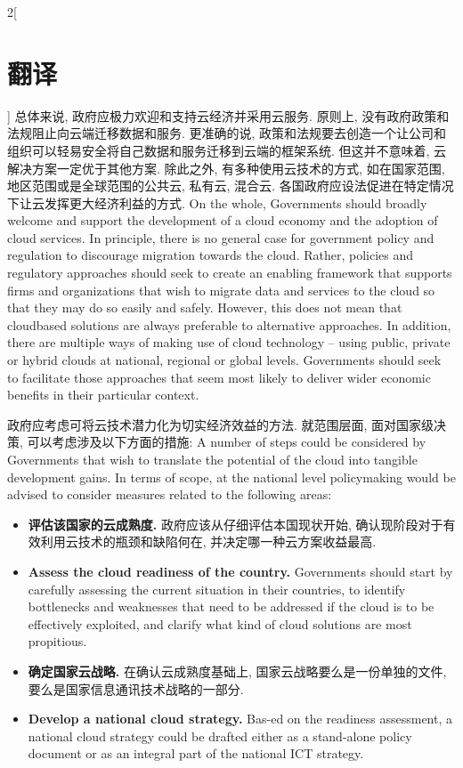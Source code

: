 \documentclass[a4paper, UTF8, 12pt]{article}
\begin{document}
\begin{paracol}{2}[\section{翻译}]
    \switchcolumn*
    总体来说, 政府应极力欢迎和支持云经济并采用云服务. 原则上, 没有政府政策和法规阻止向云端迁移数据和服务. 更准确的说, 政策和法规要去创造一个让公司和组织可以轻易安全将自己数据和服务迁移到云端的框架系统. 但这并不意味着, 云解决方案一定优于其他方案. 除此之外, 有多种使用云技术的方式, 如在国家范围, 地区范围或是全球范围的公共云, 私有云, 混合云. 各国政府应设法促进在特定情况下让云发挥更大经济利益的方式.
    \switchcolumn
    On the whole, Governments should broadly welcome and support the development of a cloud economy and the adoption of cloud services. In principle, there is no general case for government policy and regulation to discourage migration towards the cloud. Rather, policies and regulatory approaches should seek to create an enabling framework that supports firms and organizations that wish to migrate data and services to the cloud so that they may do so easily and safely. However, this does not mean that cloudbased solutions are always preferable to alternative approaches. In addition, there are multiple ways of making use of cloud technology – using public, private or hybrid clouds at national, regional or global levels. Governments should seek to facilitate those approaches that seem most likely to deliver wider economic benefits in their particular context. 

    \switchcolumn*
    政府应考虑可将云技术潜力化为切实经济效益的方法. 就范围层面, 面对国家级决策, 可以考虑涉及以下方面的措施:
    \switchcolumn
    A number of steps could be considered by Governments that wish to translate the potential of the cloud into tangible development gains. In terms of scope, at the national level policymaking would be advised to consider measures related to the following areas:

    \begin{itemize}
        \switchcolumn*
        \item {\bfseries 评估该国家的云成熟度.} 政府应该从仔细评估本国现状开始, 确认现阶段对于有效利用云技术的瓶颈和缺陷何在, 并决定哪一种云方案收益最高.
        \switchcolumn
        \item {\bfseries Assess the cloud readiness of the country.} Governments should start by carefully assessing the current situation in their countries, to identify bottlenecks and weaknesses that need to be addressed if the cloud is to be effectively exploited, and clarify what kind of cloud solutions are most propitious.  
        
        \switchcolumn*
        \item {\bfseries 确定国家云战略.} 在确认云成熟度基础上, 国家云战略要么是一份单独的文件, 要么是国家信息通讯技术战略的一部分.
        \switchcolumn
        \item {\bfseries Develop a national	cloud strategy.} Bas-ed on the readiness assessment, a national cloud strategy could be drafted either as a stand-alone policy document or as an integral part of the national ICT strategy. 
        

\end{itemize}
\end{paracol}
\end{document}
